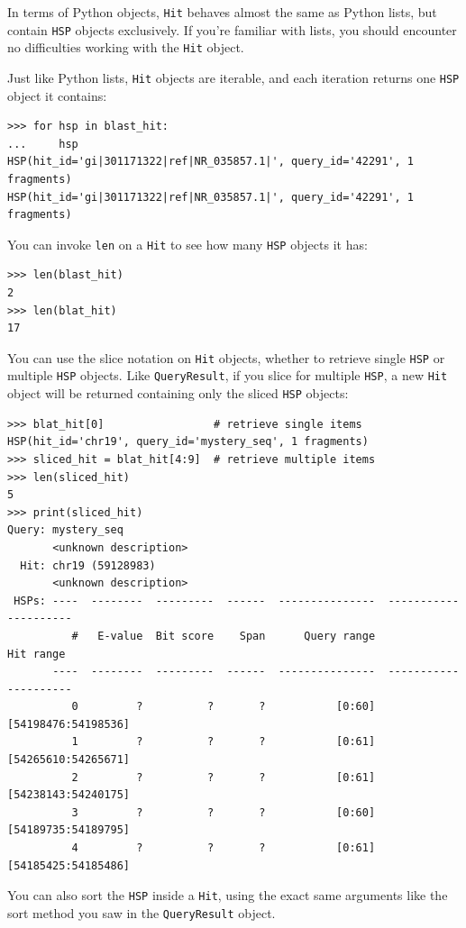 \documentclass{report}
\begin{document}
In terms of Python objects, \verb|Hit| behaves almost the same as Python lists,
but contain \verb|HSP| objects exclusively. If you're familiar with lists, you
should encounter no difficulties working with the \verb|Hit| object. 

Just like Python lists, \verb|Hit| objects are iterable, and each iteration
returns one \verb|HSP| object it contains:

\begin{verbatim}
>>> for hsp in blast_hit:
...     hsp
HSP(hit_id='gi|301171322|ref|NR_035857.1|', query_id='42291', 1 fragments)
HSP(hit_id='gi|301171322|ref|NR_035857.1|', query_id='42291', 1 fragments)
\end{verbatim}

You can invoke \verb|len| on a \verb|Hit| to see how many \verb|HSP| objects it
has:

\begin{verbatim}
>>> len(blast_hit)
2
>>> len(blat_hit)
17
\end{verbatim}

You can use the slice notation on \verb|Hit| objects, whether to retrieve single
\verb|HSP| or multiple \verb|HSP| objects. Like \verb|QueryResult|, if you slice
for multiple \verb|HSP|, a new \verb|Hit| object will be returned containing
only the sliced \verb|HSP| objects:

\begin{verbatim}
>>> blat_hit[0]                 # retrieve single items
HSP(hit_id='chr19', query_id='mystery_seq', 1 fragments)
>>> sliced_hit = blat_hit[4:9]  # retrieve multiple items
>>> len(sliced_hit)
5
>>> print(sliced_hit)
Query: mystery_seq
       <unknown description>
  Hit: chr19 (59128983)
       <unknown description>
 HSPs: ----  --------  ---------  ------  ---------------  ---------------------
          #   E-value  Bit score    Span      Query range              Hit range
       ----  --------  ---------  ------  ---------------  ---------------------
          0         ?          ?       ?           [0:60]    [54198476:54198536]
          1         ?          ?       ?           [0:61]    [54265610:54265671]
          2         ?          ?       ?           [0:61]    [54238143:54240175]
          3         ?          ?       ?           [0:60]    [54189735:54189795]
          4         ?          ?       ?           [0:61]    [54185425:54185486]
\end{verbatim}

You can also sort the \verb|HSP| inside a \verb|Hit|, using the exact same
arguments like the sort method you saw in the \verb|QueryResult| object.
\end{document}

